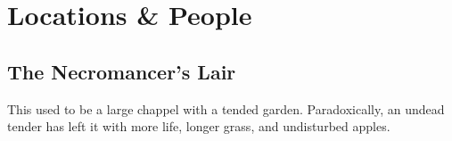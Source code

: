 \section{Locations \& People}

\begin{multicols}{2}

\setcounter{list}{0}

\subsection{The Necromancer's Lair}\label{necromancers_lair}
This used to be a large chappel with a tended garden.  Paradoxically, an undead tender has left it with more life, longer grass, and undisturbed apples.

\end{multicols}

\begin{figure}

\end{figure}

